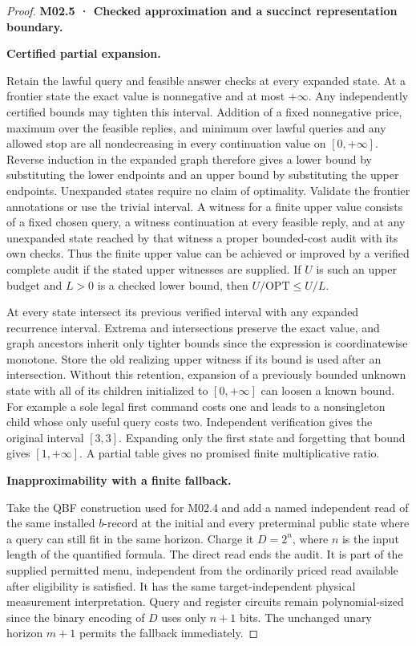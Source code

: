 \begin{proof}
\textbf{M02.5 · Checked approximation and a succinct representation boundary.}

\textbf{Certified partial expansion.}

Retain the lawful query and feasible answer checks at every expanded state. At a frontier state the exact value is nonnegative and at most \(+\infty\). Any independently certified bounds may tighten this interval. Addition of a fixed nonnegative price, maximum over the feasible replies, and minimum over lawful queries and any allowed stop are all nondecreasing in every continuation value on \([0,+\infty]\). Reverse induction in the expanded graph therefore gives a lower bound by substituting the lower endpoints and an upper bound by substituting the upper endpoints. Unexpanded states require no claim of optimality. Validate the frontier annotations or use the trivial interval. A witness for a finite upper value consists of a fixed chosen query, a witness continuation at every feasible reply, and at any unexpanded state reached by that witness a proper bounded-cost audit with its own checks. Thus the finite upper value can be achieved or improved by a verified complete audit if the stated upper witnesses are supplied. If \(U\) is such an upper budget and \(L>0\) is a checked lower bound, then \(U/\mathrm{OPT}\le U/L\).

At every state intersect its previous verified interval with any expanded recurrence interval. Extrema and intersections preserve the exact value, and graph ancestors inherit only tighter bounds since the expression is coordinatewise monotone. Store the old realizing upper witness if its bound is used after an intersection. Without this retention, expansion of a previously bounded unknown state with all of its children initialized to \([0,+\infty]\) can loosen a known bound. For example a sole legal first command costs one and leads to a nonsingleton child whose only useful query costs two. Independent verification gives the original interval \([3,3]\). Expanding only the first state and forgetting that bound gives \([1,+\infty]\). A partial table gives no promised finite multiplicative ratio.

\textbf{Inapproximability with a finite fallback.}

Take the QBF construction used for M02.4 and add a named independent read of the same installed \(b\)-record at the initial and every preterminal public state where a query can still fit in the same horizon. Charge it \(D=2^n\), where \(n\) is the input length of the quantified formula. The direct read ends the audit. It is part of the supplied permitted menu, independent from the ordinarily priced read available after eligibility is satisfied. It has the same target-independent physical measurement interpretation. Query and register circuits remain polynomial-sized since the binary encoding of \(D\) uses only \(n+1\) bits. The unchanged unary horizon \(m+1\) permits the fallback immediately.


\end{proof}
